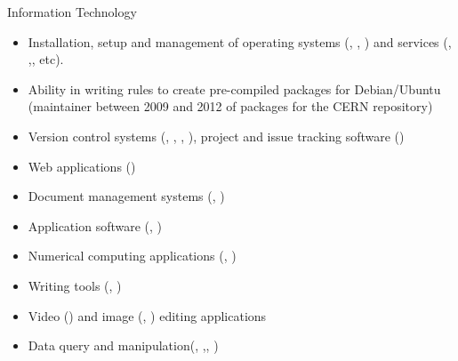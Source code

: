 \begin{cvskills}
\cvskill
{Information Technology}
{
\begin{minipage}{0.48\textwidth}
\begin{itemize}[labelwidth=\the\widest,align=right,leftmargin=!,labelsep=1pt,noitemsep]
\item[\custItem] Installation, setup and management of operating systems
(\textsc{\color{awesome}{Linux/Unix}}, \textsc{\color{awesome}{Windows}},
\textsc{\color{awesome}{MacOS}}) and services (\textsc{\color{awesome}{ssh}},
\textsc{\color{awesome}{ftp}},\textsc{\color{awesome}{nfs}}, etc).
\item[\custItem] Ability in writing rules to create pre-compiled packages for
Debian/Ubuntu (maintainer between 2009 and 2012 of \textsc{\color{awesome}{ROOT}}
packages for the CERN repository)
\item[\custItem] Version control systems (\textsc{\color{awesome}{Git}},
\textsc{\color{awesome}{GitLab}}, \textsc{\color{awesome}{svn}},
\textsc{\color{awesome}{cvs}}), project and issue tracking software
(\textsc{\color{awesome}{JIRA}})
\item[\custItem] Web applications (\textsc{\color{awesome}{Angular}})
\end{itemize}
\end{minipage}
\hfill
\begin{minipage}{0.48\textwidth}
\begin{itemize}[labelwidth=\the\widest,align=right,leftmargin=!,labelsep=1pt,noitemsep]
\item[\custItem] Document management systems (\textsc{\color{awesome}{twiki}},
\textsc{\color{awesome}{wiki}})
\item[\custItem] Application software
(\textsc{\color{awesome}{Microsoft Office}},
\textsc{\color{awesome}{Google Doc Suite}})
\item[\custItem] Numerical computing applications
(\textsc{\color{awesome}{Matlab}}, \textsc{\color{awesome}{Mathematica}})
\item[\custItem] Writing tools ({\color{awesome}{\LaTeX}},
{\color{awesome}{\TeX}})
\item[\custItem] Video (\textsc{\color{awesome}{Adobe Premiere}}) and
image (\textsc{\color{awesome}{Adobe Photoshop}},
\textsc{\color{awesome}{Gimp}}) editing applications
\item[\custItem] Data query and manipulation(\textsc{\color{awesome}{sql}}, 
\textsc{\color{awesome}{json}},\textsc{\color{awesome}{xml}},
\textsc{\color{awesome}{csv}})
\end{itemize}
\end{minipage}
}


\end{cvskills}
